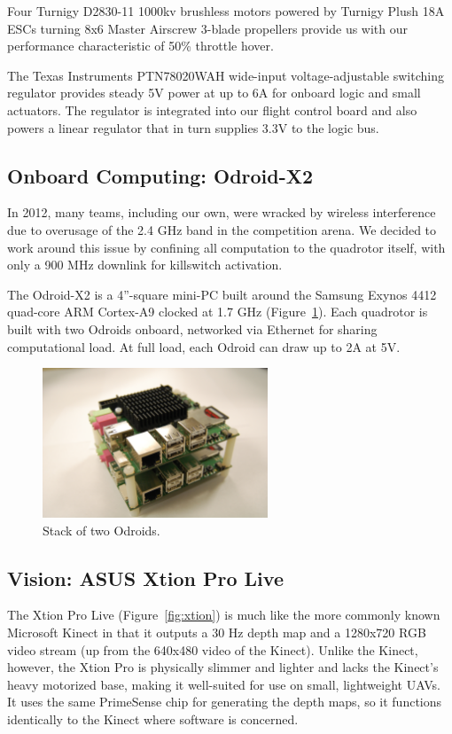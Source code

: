 \documentclass[12pt,letterpaper]{article} \usepackage[margin=1in]{geometry}
\begin{document}
Four Turnigy D2830-11 1000kv brushless motors powered by Turnigy Plush 18A ESCs
turning 8x6 Master Airscrew 3-blade propellers provide us with our performance
characteristic of 50\% throttle hover.

The Texas Instruments PTN78020WAH wide-input voltage-adjustable switching
regulator provides steady 5V power at up to 6A for onboard logic and small
actuators. The regulator is integrated into our flight control board and also
powers a linear regulator that in turn supplies 3.3V to the logic bus.


\subsection*{Onboard Computing: Odroid-X2}

In 2012, many teams, including our own, were wracked by wireless interference
due to overusage of the 2.4 GHz band in the competition arena. We decided to
work around this issue by confining all computation to the quadrotor itself,
with only a 900 MHz downlink for killswitch activation.

The Odroid-X2 is a 4”-square mini-PC built around the Samsung Exynos 4412
quad-core ARM Cortex-A9 clocked at 1.7 GHz (Figure~\ref{fig:odroids}). Each
quadrotor is built with two Odroids onboard, networked via Ethernet for sharing
computational load. At full load, each Odroid can draw up to 2A at 5V.

\begin{figure}[!h]
	\centering
	\includegraphics[width=0.6\textwidth]{img/odroid_stack.jpg}
	\caption{Stack of two Odroids.}
	\label{fig:odroids}
\end{figure}


\subsection*{Vision: ASUS Xtion Pro Live}

The Xtion Pro Live (Figure~\ref{fig:xtion}) is much like the more commonly
known Microsoft Kinect in that it outputs a 30 Hz depth map and a 1280x720 RGB
video stream (up from the 640x480 video of the Kinect). Unlike the Kinect,
however, the Xtion Pro is physically slimmer and lighter and lacks the Kinect’s
heavy motorized base, making it well-suited for use on small, lightweight UAVs.
It uses the same PrimeSense chip for generating the depth maps, so it functions
identically to the Kinect where software is concerned.
\end{document}
